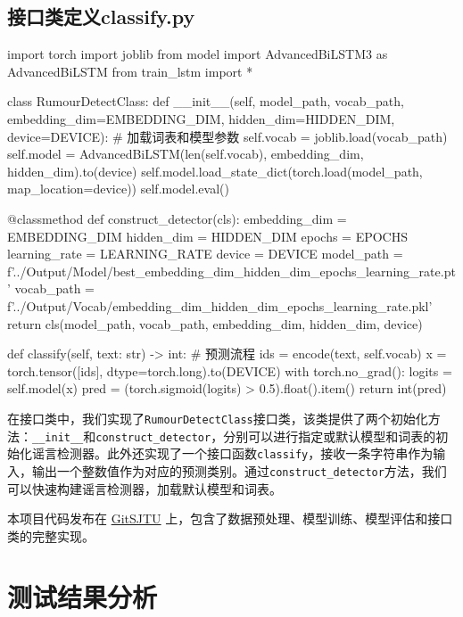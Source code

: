 \subsection{接口类定义classify.py}
\begin{codeblock}[language=Python]
import torch
import joblib
from model import AdvancedBiLSTM3 as AdvancedBiLSTM 
from train_lstm import *

class RumourDetectClass:
    def __init__(self, model_path, vocab_path, embedding_dim=EMBEDDING_DIM, hidden_dim=HIDDEN_DIM, device=DEVICE):
        # 加载词表和模型参数
        self.vocab = joblib.load(vocab_path)
        self.model = AdvancedBiLSTM(len(self.vocab), embedding_dim, hidden_dim).to(device)
        self.model.load_state_dict(torch.load(model_path, map_location=device))
        self.model.eval()

    @classmethod
    def construct_detector(cls):
        embedding_dim = EMBEDDING_DIM
        hidden_dim = HIDDEN_DIM
        epochs = EPOCHS
        learning_rate = LEARNING_RATE
        device = DEVICE
        model_path = f'../Output/Model/best_{embedding_dim}_{hidden_dim}_{epochs}_{learning_rate}.pt'
        vocab_path = f'../Output/Vocab/{embedding_dim}_{hidden_dim}_{epochs}_{learning_rate}.pkl'
        return cls(model_path, vocab_path, embedding_dim, hidden_dim, device)

    
    def classify(self, text: str) -> int:
        # 预测流程
        ids = encode(text, self.vocab)
        x = torch.tensor([ids], dtype=torch.long).to(DEVICE)
        with torch.no_grad():
            logits = self.model(x)
            pred = (torch.sigmoid(logits) > 0.5).float().item()
        return int(pred)
\end{codeblock}

在接口类中，我们实现了\verb|RumourDetectClass|接口类，该类提供了两个初始化方法：\verb|__init__|和\verb|construct_detector|，分别可以进行指定或默认模型和词表的初始化谣言检测器。此外还实现了一个接口函数\verb|classify|，接收一条字符串作为输入，输出一个整数值作为对应的预测类别。通过\verb|construct_detector|方法，我们可以快速构建谣言检测器，加载默认模型和词表。

\vspace{1em}
本项目代码发布在 \href{https://git.sjtu.edu.cn/ma_yuezhao/nis4307_rumordetect}{GitSJTU} 上，包含了数据预处理、模型训练、模型评估和接口类的完整实现。

\newpage
\section{测试结果分析}

